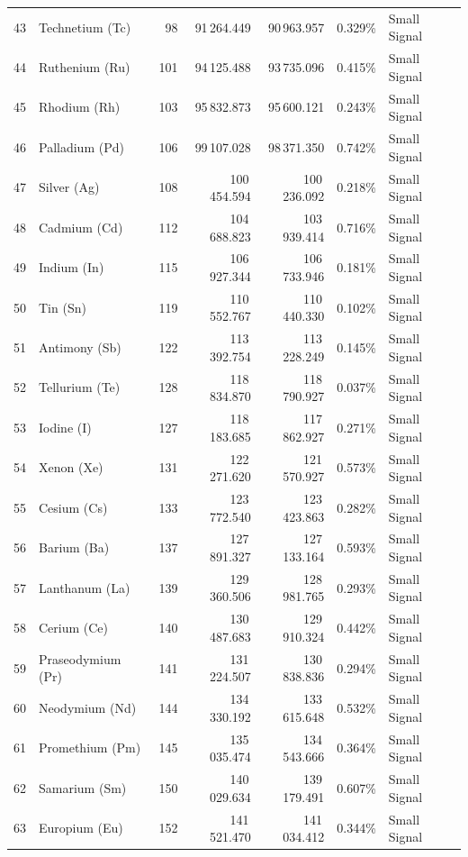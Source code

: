 \begin{footnotesize}
\begin{longtable}{r l r r r r p{3.5cm}}
43 & Technetium (Tc) & 98  & 91\,264.449  & 90\,963.957  & 0.329\% & Small Signal \\
44 & Ruthenium (Ru)  & 101 & 94\,125.488  & 93\,735.096  & 0.415\% & Small Signal \\
45 & Rhodium (Rh)    & 103 & 95\,832.873  & 95\,600.121  & 0.243\% & Small Signal \\
46 & Palladium (Pd)  & 106 & 99\,107.028  & 98\,371.350  & 0.742\% & Small Signal \\
47 & Silver (Ag)     & 108 & 100\,454.594 & 100\,236.092 & 0.218\% & Small Signal \\
48 & Cadmium (Cd)    & 112 & 104\,688.823 & 103\,939.414 & 0.716\% & Small Signal \\
49 & Indium (In)     & 115 & 106\,927.344 & 106\,733.946 & 0.181\% & Small Signal \\
50 & Tin (Sn)        & 119 & 110\,552.767 & 110\,440.330 & 0.102\% & Small Signal \\
51 & Antimony (Sb)   & 122 & 113\,392.754 & 113\,228.249 & 0.145\% & Small Signal \\
52 & Tellurium (Te)  & 128 & 118\,834.870 & 118\,790.927 & 0.037\% & Small Signal \\
53 & Iodine (I)      & 127 & 118\,183.685 & 117\,862.927 & 0.271\% & Small Signal \\
54 & Xenon (Xe)      & 131 & 122\,271.620 & 121\,570.927 & 0.573\% & Small Signal \\
\midrule
55 & Cesium (Cs)       & 133 & 123\,772.540 & 123\,423.863 & 0.282\% & Small Signal \\
56 & Barium (Ba)       & 137 & 127\,891.327 & 127\,133.164 & 0.593\% & Small Signal \\
57 & Lanthanum (La)    & 139 & 129\,360.506 & 128\,981.765 & 0.293\% & Small Signal \\
58 & Cerium (Ce)       & 140 & 130\,487.683 & 129\,910.324 & 0.442\% & Small Signal \\
59 & Praseodymium (Pr) & 141 & 131\,224.507 & 130\,838.836 & 0.294\% & Small Signal \\
60 & Neodymium (Nd)    & 144 & 134\,330.192 & 133\,615.648 & 0.532\% & Small Signal \\
61 & Promethium (Pm)   & 145 & 135\,035.474 & 134\,543.666 & 0.364\% & Small Signal \\
62 & Samarium (Sm)     & 150 & 140\,029.634 & 139\,179.491 & 0.607\% & Small Signal \\
63 & Europium (Eu)     & 152 & 141\,521.470 & 141\,034.412 & 0.344\% & Small Signal \\

\end{longtable}
\end{footnotesize}
